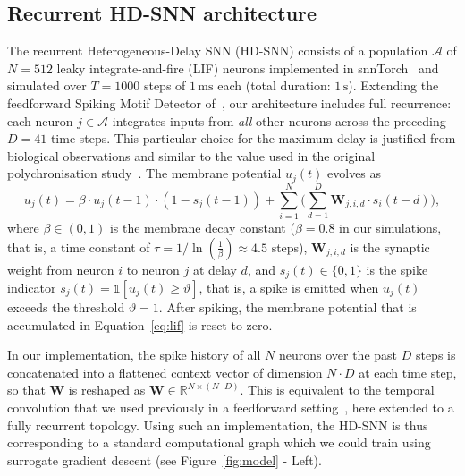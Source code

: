 \documentclass{article}
\begin{document}
\subsection{Recurrent HD-SNN architecture} %

The recurrent Heterogeneous-Delay SNN (HD-SNN) consists of a population $\mathcal{A}$ of $N = 512$ leaky integrate-and-fire (LIF) neurons implemented in {\sc snnTorch}~\citep{Eshraghian2023} and simulated over $T = 1000$ steps of $1\,\mathrm{ms}$ each (total duration: $1\,\mathrm{s}$). Extending the feedforward Spiking Motif Detector of~\citet{Perrinet2023}, our architecture includes full recurrence: each neuron $j \in \mathcal{A}$  integrates inputs from  \emph{all} other neurons across the preceding $D = 41$ time steps. This particular choice for the maximum delay is justified from biological observations and similar to the value used in the original polychronisation study~\citep{Izhikevich2006}. The membrane potential $u_j(t)$ evolves as
\begin{equation}
  u_j(t)
  = \beta \cdot u_j(t-1) \cdot (1 - s_j(t-1))
    + \sum_{i=1}^{N} \bigl (
      \sum_{d=1}^{D} \mathbf{W}_{j, i, d} \cdot s_i(t-d) \bigr ), 
  \label{eq:lif}
\end{equation}
where $\beta \in (0,1)$ is the membrane decay constant ($\beta = 0.8$ in our simulations, that is, a time constant of $\tau= 1 / \ln(\frac 1 \beta) \approx 4.5$ steps), $\mathbf{W}_{j, i, d}$ is the synaptic weight from neuron $i$ to neuron $j$ at delay $d$, and $s_j(t) \in \{0,1\}$  is the spike indicator $s_j(t) = \mathds{1}[u_j(t) \geq \vartheta]$, that is, a spike is emitted when $u_j(t)$ exceeds the threshold $\vartheta = 1$. After spiking, the membrane potential that is accumulated in Equation~\ref{eq:lif} is reset to zero.

In our implementation, the spike history of all $N$ neurons over the past $D$ steps is concatenated into a flattened context vector of dimension $N \cdot D$ at each time step, so that $\mathbf{W}$ is reshaped as $\mathbf{W} \in \mathbb{R}^{N \times (N \cdot D)}$. This is equivalent to the temporal convolution that we used previously in a feedforward setting~\citep{Perrinet2023}, here extended to a fully recurrent topology. Using such an implementation, the HD-SNN is thus corresponding to a standard computational graph which we could train using surrogate gradient descent (see Figure~\ref{fig:model} - Left).
\end{document}
